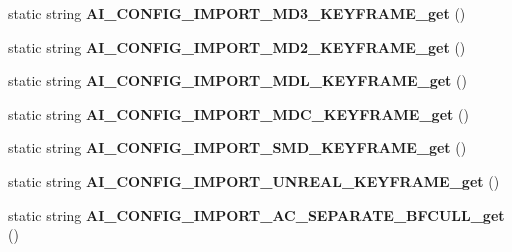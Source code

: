 \begin{DoxyCompactItemize}
\item 
\hypertarget{class_assimp_p_i_n_v_o_k_e_a81080de71652770c4fd9177e4108fa89}{static string {\bfseries A\+I\+\_\+\+C\+O\+N\+F\+I\+G\+\_\+\+I\+M\+P\+O\+R\+T\+\_\+\+M\+D3\+\_\+\+K\+E\+Y\+F\+R\+A\+M\+E\+\_\+get} ()}\label{class_assimp_p_i_n_v_o_k_e_a81080de71652770c4fd9177e4108fa89}

\item 
\hypertarget{class_assimp_p_i_n_v_o_k_e_a137383afbdb9649ea9ed87763cd6a707}{static string {\bfseries A\+I\+\_\+\+C\+O\+N\+F\+I\+G\+\_\+\+I\+M\+P\+O\+R\+T\+\_\+\+M\+D2\+\_\+\+K\+E\+Y\+F\+R\+A\+M\+E\+\_\+get} ()}\label{class_assimp_p_i_n_v_o_k_e_a137383afbdb9649ea9ed87763cd6a707}

\item 
\hypertarget{class_assimp_p_i_n_v_o_k_e_aab82f19a088c6f914a3489011b404d70}{static string {\bfseries A\+I\+\_\+\+C\+O\+N\+F\+I\+G\+\_\+\+I\+M\+P\+O\+R\+T\+\_\+\+M\+D\+L\+\_\+\+K\+E\+Y\+F\+R\+A\+M\+E\+\_\+get} ()}\label{class_assimp_p_i_n_v_o_k_e_aab82f19a088c6f914a3489011b404d70}

\item 
\hypertarget{class_assimp_p_i_n_v_o_k_e_acaf9c00d6dd01999f4353df04fb84cba}{static string {\bfseries A\+I\+\_\+\+C\+O\+N\+F\+I\+G\+\_\+\+I\+M\+P\+O\+R\+T\+\_\+\+M\+D\+C\+\_\+\+K\+E\+Y\+F\+R\+A\+M\+E\+\_\+get} ()}\label{class_assimp_p_i_n_v_o_k_e_acaf9c00d6dd01999f4353df04fb84cba}

\item 
\hypertarget{class_assimp_p_i_n_v_o_k_e_af72a5bb4968c4c48a499dc9770bb35d6}{static string {\bfseries A\+I\+\_\+\+C\+O\+N\+F\+I\+G\+\_\+\+I\+M\+P\+O\+R\+T\+\_\+\+S\+M\+D\+\_\+\+K\+E\+Y\+F\+R\+A\+M\+E\+\_\+get} ()}\label{class_assimp_p_i_n_v_o_k_e_af72a5bb4968c4c48a499dc9770bb35d6}

\item 
\hypertarget{class_assimp_p_i_n_v_o_k_e_afafd61912a404995ddd8c3c61f5f2f64}{static string {\bfseries A\+I\+\_\+\+C\+O\+N\+F\+I\+G\+\_\+\+I\+M\+P\+O\+R\+T\+\_\+\+U\+N\+R\+E\+A\+L\+\_\+\+K\+E\+Y\+F\+R\+A\+M\+E\+\_\+get} ()}\label{class_assimp_p_i_n_v_o_k_e_afafd61912a404995ddd8c3c61f5f2f64}

\item 
\hypertarget{class_assimp_p_i_n_v_o_k_e_a8f5f5254275de72be5139c4d4abd97a3}{static string {\bfseries A\+I\+\_\+\+C\+O\+N\+F\+I\+G\+\_\+\+I\+M\+P\+O\+R\+T\+\_\+\+A\+C\+\_\+\+S\+E\+P\+A\+R\+A\+T\+E\+\_\+\+B\+F\+C\+U\+L\+L\+\_\+get} ()}\label{class_assimp_p_i_n_v_o_k_e_a8f5f5254275de72be5139c4d4abd97a3}


\end{DoxyCompactItemize}
